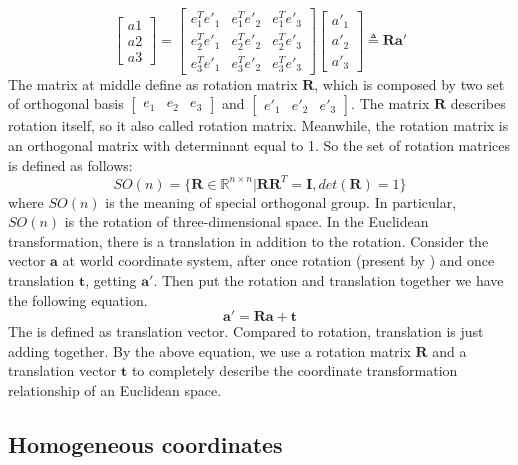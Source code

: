 $$
    \begin{bmatrix}
        a1\\
        a2\\
        a3
    \end{bmatrix}=
    \begin{bmatrix}
        e^T_1e'_1 & e^T_1e'_2 & e^T_1e'_3\\
        e^T_2e'_1 & e^T_2e'_2 & e^T_2e'_3\\
        e^T_3e'_1 & e^T_3e'_2 & e^T_3e'_3
    \end{bmatrix}
    \begin{bmatrix}
    a'_1\\
    a'_2\\
    a'_3
    \end{bmatrix}
    \triangleq \pmb{Ra}'
$$
The matrix at middle define as rotation matrix $\pmb{R}$, which is composed by two set of orthogonal basis 
$
\begin{bmatrix}
    e_1 & e_2 & e_3 
\end{bmatrix} 
$ and 
$ 
\begin{bmatrix}
    e'_1 & e'_2 & e'_3 
\end{bmatrix}. 
$
The matrix $\pmb{R}$ describes rotation itself, so it also called rotation matrix. Meanwhile, the rotation matrix is an orthogonal matrix with determinant equal to 1. So the set of rotation matrices is defined as follows:
\begin{equation}
    SO(n)=\{\pmb{R} \in \mathbb{R}^{n\times n} | \pmb{R}\pmb{R}^T = \pmb{I}, det(\pmb{R}) = 1\}
\end{equation}
where $SO(n)$ is the meaning of special orthogonal group. In particular, $SO(n)$ is the rotation of three-dimensional space. In the Euclidean transformation, there is a translation in addition to the rotation.
Consider the vector $\pmb{a}$ at world coordinate system, after once rotation (present by ) and once translation $\pmb{t}$, getting $\pmb{a}'$. Then put the rotation and translation together we have the following equation.
\begin{equation}
\pmb{a}'=\pmb{Ra} + \pmb{t}
\end{equation}
The  is defined as translation vector. Compared to rotation, translation is just adding together. By the above equation, we use a rotation matrix $\pmb{R}$ and a translation vector $\pmb{t}$ to completely describe the coordinate transformation relationship of an Euclidean space.

\subsection{Homogeneous coordinates}

